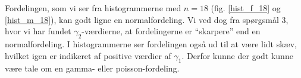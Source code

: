 \documentclass[a4paper, 10pt, danish, final]{article}
\begin{document}
Fordelingen, som vi ser fra histogrammerne med $n = 18$ (fig.
\ref{hist_f_18} og \ref{hist_m_18}), kan godt ligne en normalfordeling.
Vi ved dog fra spørgsmål 3, hvor vi har fundet $\gamma_2$-værdierne, at
fordelingerne er ``skarpere'' end en normalfordeling. I histogrammerne
ser fordelingen også ud til at være lidt skæv, hvilket igen er indikeret
af positive værdier af $\gamma_1$. Derfor kunne der godt kunne være tale
om en gamma- eller poisson-fordeling.

\begin{figure}[!h]
    \centering
    \\
    \\

\end{figure}
\end{document}
